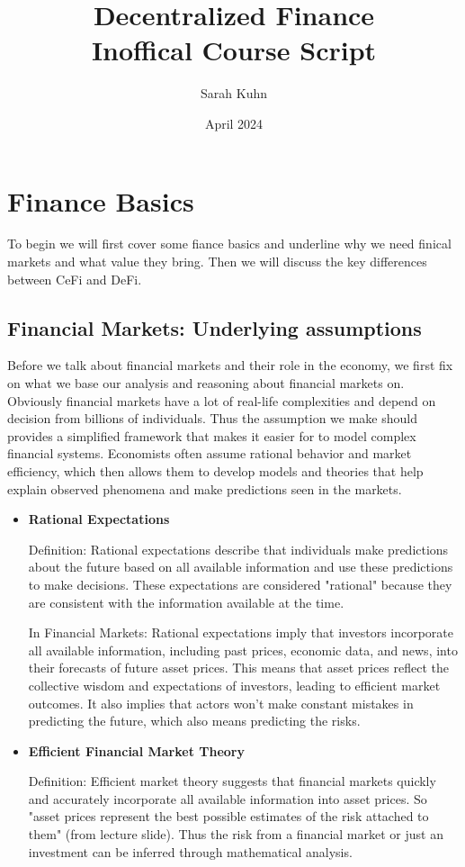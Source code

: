 \documentclass{article}
\title{%
  Decentralized Finance \\
  \large Inoffical Course Script}
\author{Sarah Kuhn}
\date{April 2024}
\begin{document}
\maketitle
\thispagestyle{empty} %

\newpage
{} %
\setcounter{page}{1} %

\section{Finance Basics}
To begin we will first cover some fiance basics and underline why we need finical markets and what value they bring. Then we will discuss the key differences between CeFi and DeFi.
\subsection{Financial Markets: Underlying assumptions} 
Before we  talk about financial markets and their role in the economy, we first fix on what we base our analysis and reasoning about financial markets on. Obviously financial markets have a lot of real-life complexities and depend on decision from billions of individuals. Thus the assumption we make should provides a simplified framework that makes it easier for  to model complex financial systems. Economists often assume rational behavior and market efficiency, which then allows them to develop models and theories that help explain observed phenomena and make predictions seen in the markets.
\begin{itemize}
    \item \textbf{Rational Expectations}

Definition: Rational expectations describe that individuals make predictions about the future based on all available information and use these predictions to make decisions. These expectations are considered "rational" because they are consistent with the information available at the time.

In Financial Markets: Rational expectations imply that investors incorporate all available information, including past prices, economic data, and news, into their forecasts of future asset prices. This means that asset prices reflect the collective wisdom and expectations of investors, leading to efficient market outcomes. It also implies that actors won't make constant mistakes in predicting the future, which also means predicting the risks. 

    \item \textbf{Efficient Financial Market Theory}

    Definition: Efficient market theory suggests that financial markets quickly and accurately incorporate all available information into asset prices. So "asset prices represent the best possible estimates of the risk attached to them" (from lecture slide). Thus the risk from a financial market or just an investment can be inferred through mathematical analysis.

    \end{itemize}
\end{document}
